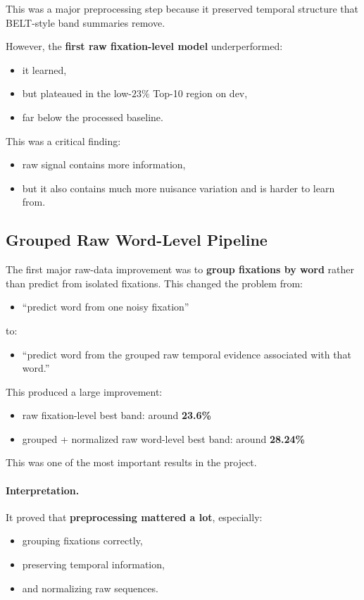 \documentclass[11pt]{article}
\begin{document}
This was a major preprocessing step because it preserved temporal structure that BELT-style band summaries remove.

However, the \textbf{first raw fixation-level model} underperformed:
\begin{itemize}
    \item it learned,
    \item but plateaued in the low-\(23\%\) Top-10 region on dev,
    \item far below the processed baseline.
\end{itemize}

This was a critical finding:
\begin{itemize}
    \item raw signal contains more information,
    \item but it also contains much more nuisance variation and is harder to learn from.
\end{itemize}

\subsection{Grouped Raw Word-Level Pipeline}

The first major raw-data improvement was to \textbf{group fixations by word} rather than predict from isolated fixations. This changed the problem from:
\begin{itemize}
    \item ``predict word from one noisy fixation''
\end{itemize}
to:
\begin{itemize}
    \item ``predict word from the grouped raw temporal evidence associated with that word.''
\end{itemize}

This produced a large improvement:
\begin{itemize}
    \item raw fixation-level best band: around \textbf{23.6\%}
    \item grouped + normalized raw word-level best band: around \textbf{28.24\%}
\end{itemize}

This was one of the most important results in the project.

\paragraph{Interpretation.}
It proved that \textbf{preprocessing mattered a lot}, especially:
\begin{itemize}
    \item grouping fixations correctly,
    \item preserving temporal information,
    \item and normalizing raw sequences.
\end{itemize}
\end{document}
